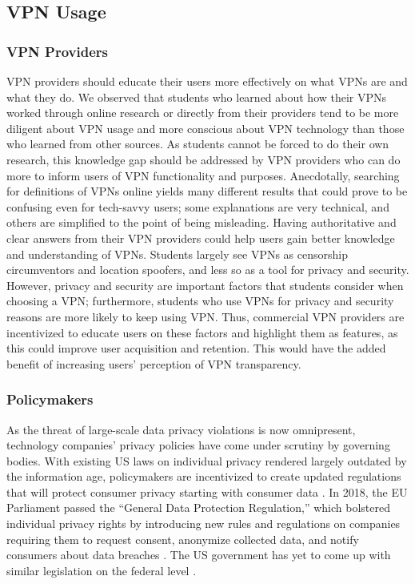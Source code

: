 \subsection{VPN Usage} \subsubsection{VPN Providers}

VPN providers should educate their users more effectively on what VPNs are and
what they do. We observed that students who learned about how their VPNs
worked through online research or directly from their providers tend to be
more diligent about VPN usage and more conscious about VPN technology than
those who learned from other sources. As students cannot be forced to do their
own research, this knowledge gap should be addressed by VPN providers who can
do more to inform users of VPN functionality and purposes. Anecdotally,
searching for definitions of VPNs online yields many different results that
could prove to be confusing even for tech-savvy users; some explanations are
very technical, and others are simplified to the point of being misleading.
Having authoritative and clear answers from their VPN providers could help
users gain better knowledge and understanding of VPNs. Students largely see
VPNs as censorship circumventors and location spoofers, and less so as a tool
for privacy and security. However, privacy and security are important factors
that students consider when choosing a VPN; furthermore, students who use VPNs
for privacy and security reasons are more likely to keep using VPN. Thus,
commercial VPN providers are incentivized to educate users on these factors
and highlight them as features, as this could improve user acquisition and
retention. This would have the added benefit of increasing users’ perception
of VPN transparency.

\subsubsection{Policymakers}

As the threat of large-scale data privacy violations is now omnipresent,
technology companies’ privacy policies have come under scrutiny by governing
bodies. With existing US laws on individual privacy rendered largely outdated
by the information age, policymakers are incentivized to create updated
regulations that will protect consumer privacy starting with consumer data
\cite{runnegar_31}. In 2018, the EU Parliament passed the “General Data Protection
Regulation,” which bolstered individual privacy rights by introducing new
rules and regulations on companies requiring them to request consent,
anonymize collected data, and notify consumers about data breaches \cite{de_groot_30}. The
US government has yet to come up with similar legislation on the federal level
\cite{runnegar_31}.

